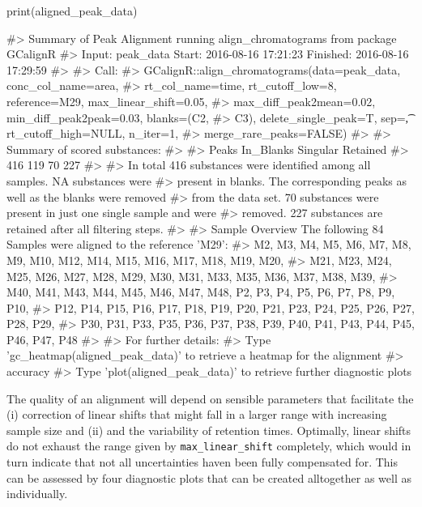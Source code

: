 \begin{Schunk}
\begin{Sinput}
print(aligned_peak_data)
\end{Sinput}
\begin{Soutput}
#>   Summary of Peak Alignment running align_chromatograms from package GCalignR
#>   Input: peak_data   Start:  2016-08-16 17:21:23     Finished:  2016-08-16 17:29:59 
#> 
#> Call:
#>   GCalignR::align_chromatograms(data=peak_data, conc_col_name=area,
#>   rt_col_name=time, rt_cutoff_low=8, reference=M29, max_linear_shift=0.05,
#>   max_diff_peak2mean=0.02, min_diff_peak2peak=0.03, blanks=(C2,
#>   C3), delete_single_peak=T, sep=\t, rt_cutoff_high=NULL, n_iter=1,
#>   merge_rare_peaks=FALSE)
#> 
#> Summary of scored substances:
#> 
#>     Peaks In_Blanks  Singular  Retained 
#>       416       119        70       227 
#> 
#>   In total 416 substances were identified among all samples. NA substances were
#>   present in blanks. The corresponding peaks as well as the blanks were removed
#>   from the data set. 70 substances were present in just one single sample and were
#>   removed. 227 substances are retained after all filtering steps.
#> 
#> Sample Overview  The following 84 Samples were aligned to the reference 'M29':
#>   M2, M3, M4, M5, M6, M7, M8, M9, M10, M12, M14, M15, M16, M17, M18, M19, M20,
#>   M21, M23, M24, M25, M26, M27, M28, M29, M30, M31, M33, M35, M36, M37, M38, M39,
#>   M40, M41, M43, M44, M45, M46, M47, M48, P2, P3, P4, P5, P6, P7, P8, P9, P10,
#>   P12, P14, P15, P16, P17, P18, P19, P20, P21, P23, P24, P25, P26, P27, P28, P29,
#>   P30, P31, P33, P35, P36, P37, P38, P39, P40, P41, P43, P44, P45, P46, P47, P48
#> 
#> For further details:
#>   Type 'gc_heatmap(aligned_peak_data)' to retrieve a heatmap for the alignment
#>   accuracy
#>   Type 'plot(aligned_peak_data)' to retrieve further diagnostic plots
\end{Soutput}
\end{Schunk}

The quality of an alignment will depend on sensible parameters that
facilitate the (i) correction of linear shifts that might fall in a
larger range with increasing sample size and (ii) and the variability of
retention times. Optimally, linear shifts do not exhaust the range given
by \texttt{max\_linear\_shift} completely, which would in turn indicate
that not all uncertainties haven been fully compensated for. This can be
assessed by four diagnostic plots that can be created alltogether as
well as individually.

